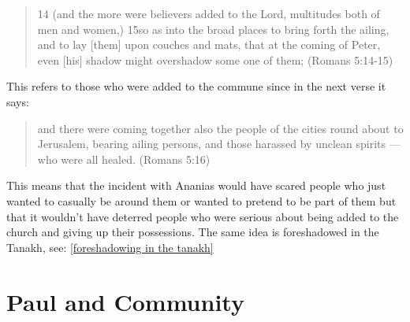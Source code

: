 \documentclass[11pt]{article}
\begin{document}
\begin{quote}
14 (and the more were believers added to the Lord, multitudes both of men and women,) 15so as into the broad places to bring forth the ailing, and to lay [them] upon couches and mats, that at the coming of Peter, even [his] shadow might overshadow some one of them; (Romans 5:14-15)
\end{quote}
 This refers to those who were added to the commune since in the next verse it says: 
\begin{quote}
and there were coming together also the people of the cities round about to Jerusalem, bearing ailing persons, and those harassed by unclean spirits — who were all healed. (Romans 5:16)
\end{quote}
This means that the incident with Ananias would have scared people who just wanted to casually be around them or wanted to pretend to be part of them but that it wouldn't have deterred people who were serious about being added to the church and giving up their possessions. The same idea is foreshadowed in the Tanakh, see: \ref{foreshadowing in the tanakh}

\section{Paul and Community}
\end{document}
